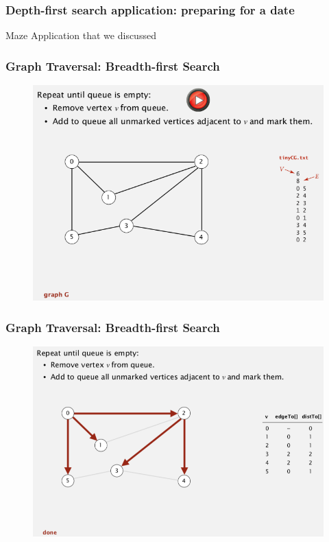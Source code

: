 \documentclass[11pt]{beamer}
\begin{document}
\begin{frame}
	\frametitle	{Depth-first search application: preparing for a date} 
    \alert{Maze Application that we discussed}
\end{frame}

\begin{frame}
	\frametitle	{Graph Traversal: Breadth-first Search} 
    \begin{figure}
    	\centering
    	\includegraphics[width=0.9\linewidth]{"Screenshot 2020-12-01 at 11.08.51 AM"}
    	\label{fig:screenshot-2020-12-01-at-11}
    \end{figure}   
\end{frame}

\begin{frame}
	\frametitle	{Graph Traversal: Breadth-first Search} 
    \begin{figure}
    	\centering
    	\includegraphics[width=0.95\linewidth]{"Screenshot 2020-12-01 at 11.11.15 AM"}
    	\label{fig:screenshot-2020-12-01-at-11}
    \end{figure}   
\end{frame}
\end{document}
